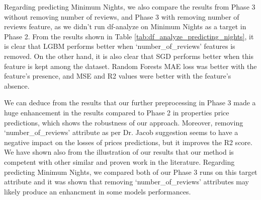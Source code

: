 \documentclass[a4paper,12pt]{article}
\begin{document}
Regarding predicting Minimum Nights, we also compare the results from Phase 3 without removing number of reviews, and Phase 3 with removing number of reviews feature, as we didn't run df-analyze on Minimum Nights as a target in Phase 2. From the results shown in Table \ref{tab:df_analyze_predicting_nights}, it is clear that LGBM performs better when `number\_of\_reviews' features is removed. On the other hand, it is also clear that SGD performs better when this feature is kept among the dataset. Random Forests MAE loss was better with the feature's presence, and MSE and R2 values were better with the feature's absence.

\begin{table}[h!]
    \centering
    \caption{df-Analyze Results of Predicting Minimum Nights}
    \label{tab:df_analyze_predicting_nights}
\end{table}

We can deduce from the results that our further preprocessing in Phase 3 made a huge enhancement in the results compared to Phase 2 in properties price predictions, which shows the robustness of our approach. Moreover, removing `number\_of\_reviews' attribute as per Dr. Jacob suggestion seems to have a negative impact on the losses of prices predictions, but it improves the R2 score. We have shown also from the illustration of our results that our method is competent with other similar and proven work in the literature. Regarding predicting Minimum Nights, we compared both of our Phase 3 runs on this target attribute and it was shown that removing `number\_of\_reviews' attributes may likely produce an enhancment in some models performances.
\end{document}
